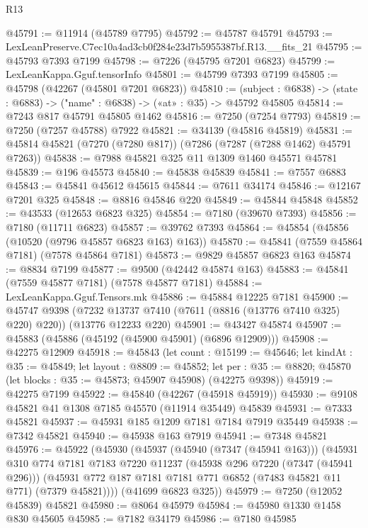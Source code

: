 \begin{lexlean}{R13}
\begin{coremodule}
@45791 := @11914 (@45789 @7795)
@45792 := @45787 @45791
@45793 := LexLeanPreserve.C7ec10a4ad3cb0f284e23d7b5955387bf.R13.__fits_21
@45795 := @45793 @7393 @7199
@45798 := @7226 (@45795 @7201 @6823)
@45799 := LexLeanKappa.Gguf.tensorInfo
@45801 := @45799 @7393 @7199
@45805 := @45798 (@42267 (@45801 @7201 @6823))
@45810 := (subject : @6838) -> (state : @6883) -> ("name" : @6838) -> («at» : @35) -> @45792 @45805
@45814 := @7243 @817 @45791 @45805 @1462
@45816 := @7250 (@7254 @7793)
@45819 := @7250 (@7257 @45788) @7922
@45821 := @34139 (@45816 @45819)
@45831 := @45814 @45821 (@7270 (@7280 @817)) (@7286 (@7287 (@7288 @1462) @45791 @7263))
@45838 := @7988 @45821 @325 @11 @1309 @1460 @45571 @45781
@45839 := @196 @45573
@45840 := @45838 @45839
@45841 := @7557 @6883
@45843 := @45841 @45612 @45615
@45844 := @7611 @34174
@45846 := @12167 @7201 @325
@45848 := @8816 @45846 @220
@45849 := @45844 @45848
@45852 := @43533 (@12653 @6823 @325)
@45854 := @7180 (@39670 @7393)
@45856 := @7180 (@11711 @6823)
@45857 := @39762 @7393
@45864 := @45854 (@45856 (@10520 (@9796 @45857 @6823 @163) @163))
@45870 := @45841 (@7559 @45864 @7181) (@7578 @45864 @7181)
@45873 := @9829 @45857 @6823 @163
@45874 := @8834 @7199
@45877 := @9500 (@42442 @45874 @163)
@45883 := @45841 (@7559 @45877 @7181) (@7578 @45877 @7181)
@45884 := LexLeanKappa.Gguf.Tensors.mk
@45886 := @45884 @12225 @7181
@45900 := @45747
    @9398
    (@7232 @13737 @7410 (@7611 (@8816 (@13776 @7410 @325) @220) @220))
    (@13776 @12233 @220)
@45901 := @43427 @45874
@45907 := @45883 (@45886 (@45192 (@45900 @45901) (@6896 @12909)))
@45908 := @42275 @12909
@45918 := @45843
    (let count : @15199 := @45646;
    let kindAt : @35 := @45849;
    let layout : @8809 := @45852;
    let per : @35 := @8820; @45870 (let blocks : @35 := @45873; @45907 @45908) (@42275 @9398))
@45919 := @42275 @7199
@45922 := @45840 (@42267 (@45918 @45919))
@45930 := @9108 @45821 @41 @1308 @7185 @45570 (@11914 @35449) @45839
@45931 := @7333 @45821
@45937 := @45931 @185 @1209 @7181 @7184 @7919 @35449
@45938 := @7342 @45821
@45940 := @45938 @163 @7919
@45941 := @7348 @45821
@45976 := @45922
    (@45930
      (@45937
        (@45940 (@7347 (@45941 @163)))
        (@45931
          @310
          @774
          @7181
          @7183
          @7220
          @11237
          (@45938 @296 @7220 (@7347 (@45941 @296)))
          (@45931 @772 @187 @7181 @7181 @771 @6852 (@7483 @45821 @11 @771) (@7379 @45821))))
      (@41699 @6823 @325))
@45979 := @7250 (@12052 @45839) @45821
@45980 := @8064 @45979
@45984 := @45980 @1330 @1458 @830 @45605
@45985 := @7182 @34179
@45986 := @7180 @45985

\end{coremodule}
\end{lexlean}
